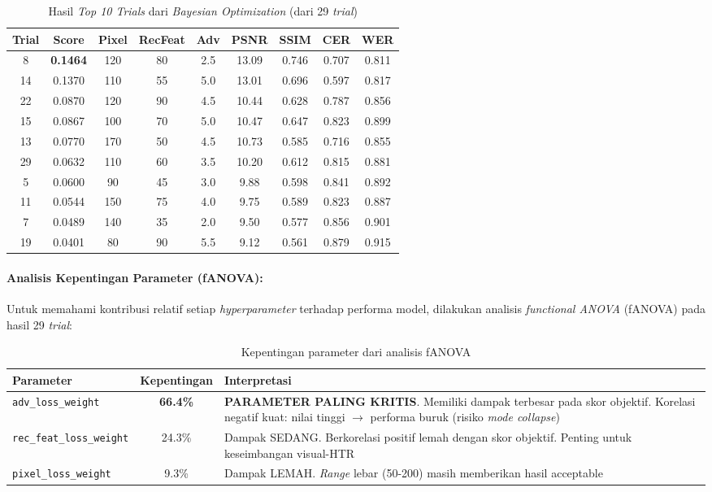 \documentclass{article}
\begin{document}
\begin{table}[H]
\centering
\caption{Hasil \textit{Top 10 Trials} dari \textit{Bayesian Optimization} (dari 29 \textit{trial})}
\label{tab:hpo_top10}
\small
\begin{tabular}{ccccccccc}
\toprule
\textbf{Trial} & \textbf{Score} & \textbf{Pixel} & \textbf{RecFeat} & \textbf{Adv} & \textbf{PSNR} & \textbf{SSIM} & \textbf{CER} & \textbf{WER} \\
\midrule
8 & \textbf{0.1464} & 120 & 80 & 2.5 & 13.09 & 0.746 & 0.707 & 0.811 \\
14 & 0.1370 & 110 & 55 & 5.0 & 13.01 & 0.696 & 0.597 & 0.817 \\
22 & 0.0870 & 120 & 90 & 4.5 & 10.44 & 0.628 & 0.787 & 0.856 \\
15 & 0.0867 & 100 & 70 & 5.0 & 10.47 & 0.647 & 0.823 & 0.899 \\
13 & 0.0770 & 170 & 50 & 4.5 & 10.73 & 0.585 & 0.716 & 0.855 \\
29 & 0.0632 & 110 & 60 & 3.5 & 10.20 & 0.612 & 0.815 & 0.881 \\
5 & 0.0600 & 90 & 45 & 3.0 & 9.88 & 0.598 & 0.841 & 0.892 \\
11 & 0.0544 & 150 & 75 & 4.0 & 9.75 & 0.589 & 0.823 & 0.887 \\
7 & 0.0489 & 140 & 35 & 2.0 & 9.50 & 0.577 & 0.856 & 0.901 \\
19 & 0.0401 & 80 & 90 & 5.5 & 9.12 & 0.561 & 0.879 & 0.915 \\
\bottomrule
\end{tabular}
\end{table}

\paragraph{Analisis Kepentingan Parameter (fANOVA):}

Untuk memahami kontribusi relatif setiap \textit{hyperparameter} terhadap performa model, dilakukan analisis \textit{functional ANOVA} (fANOVA) pada hasil 29 \textit{trial}:

\begin{table}[H]
\centering
\caption{Kepentingan parameter dari analisis fANOVA}
\label{tab:param-importance-results}
\small
\begin{tabular}{lcp{8cm}}
\toprule
\textbf{Parameter} & \textbf{Kepentingan} & \textbf{Interpretasi} \\
\midrule
\texttt{adv\_loss\_weight} & \textbf{66.4\%} & \textbf{PARAMETER PALING KRITIS}. Memiliki dampak terbesar pada skor objektif. Korelasi negatif kuat: nilai tinggi $\rightarrow$ performa buruk (risiko \textit{mode collapse}) \\
\texttt{rec\_feat\_loss\_weight} & 24.3\% & Dampak SEDANG. Berkorelasi positif lemah dengan skor objektif. Penting untuk keseimbangan visual-HTR \\
\texttt{pixel\_loss\_weight} & 9.3\% & Dampak LEMAH. \textit{Range} lebar (50-200) masih memberikan hasil acceptable \\
\bottomrule
\end{tabular}
\end{table}
\end{document}
